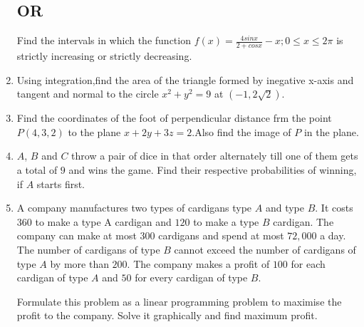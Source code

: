 \documentclass{article}
\begin{document}
\begin{enumerate}
		 \subsection*{\centering OR}
		 Find the intervals in which the function $f(x)=\frac{4sinx}{2+cosx}-x;0\leq x \leq 2\pi$ is strictly increasing or strictly decreasing.
	 \item Using integration,find the area of the triangle formed by inegative x-axis and tangent and normal to the circle $x^2+y^2=9$ at $(-1,2\sqrt{2})$.
	 \item Find the coordinates of the foot of perpendicular distance frm the point $P(4,3,2)$ to the plane $x+2y+3z=2$.Also find the image of $P$ in the plane.
	 \item $A$, $B$ and $C$ throw a pair of dice in that order alternately till one of them gets a total of $9$ and wins the game. Find their respective probabilities of winning, if $A$ starts first.
	 \item A company manufactures two types of cardigans type $A$ and type $B$. It costs \rupee $360$ to make a type A cardigan and \rupee $120$ to make a type $B$ cardigan. The company can make at most $300$ cardigans and spend at most \rupee $72,000$ a day. The number of cardigans of type $B$ cannot exceed the number of cardigans of type $A$ by more than \rupee $200$. The company makes a profit of \rupee $100$ for each cardigan of type $A$ and \rupee $50$ for every cardigan of type $B$.

Formulate this problem as a linear programming problem to maximise the profit to the company. Solve it graphically and find maximum profit.
\end{enumerate}
\end{document}
